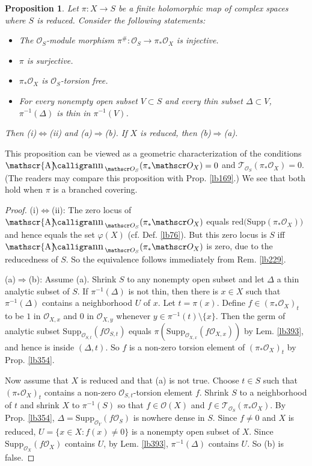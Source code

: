 \documentclass[12pt,b5paper,notitlepage]{report}
\theoremstyle{definition}
\theoremstyle{plain}
\newtheorem{pp}[df]{Proposition}
\DeclareMathOperator{\sann}{\mathscr{A}\text{\kern -3pt {\calligra\large nn}}\,}
\newcommand{\scr}{\mathscr}
\newcommand{\Supp}{\mathrm{Supp}}
\newcommand{\red}{\mathrm{red}}
\numberwithin{equation}{section}
\begin{document}
\begin{pp}\label{lb230}
Let $\pi:X\rightarrow S$ be a finite holomorphic map of complex spaces where $S$ is reduced. Consider the following statements:
\begin{itemize}
\item[(i)] The $\scr O_S$-module morphism $\pi^\#:\scr O_S\rightarrow \pi_*\scr O_X$ is injective.
\item[(ii)] $\pi$ is surjective. 
\item[(a)] $\pi_*\scr O_X$ is $\scr O_S$-torsion free.
\item[(b)] For every nonempty open subset $V\subset S$ and every thin subset $\Delta\subset V$, $\pi^{-1}(\Delta)$ is thin in $\pi^{-1}(V)$.
\end{itemize}
Then (i)$\Leftrightarrow$(ii) and (a)$\Rightarrow$(b). If $X$ is reduced, then (b)$\Rightarrow$(a).
\end{pp}

This proposition can be viewed as a geometric characterization of the conditions $\sann_{\scr O_S}(\pi_*\scr O_X)=0$ and $\scr T_{\scr O_S}(\pi_*\scr O_X)=0$. (The readers may compare this proposition with Prop. \ref{lb169}.) We see that both hold when $\pi$ is a branched covering.

\begin{proof}
(i)$\Leftrightarrow$(ii): The zero locus of $\sann_{\scr O_S}(\pi_*\scr O_X)$ equals $\red\big(\Supp(\pi_*\scr O_X)\big)$ and hence equals the set $\varphi(X)$ (cf. Def. \ref{lb76}). But this zero locus is $S$ iff $\sann_{\scr O_S}(\pi_*\scr O_X)$ is zero, due to the reducedness of $S$. So the equivalence follows immediately from Rem. \ref{lb229}. 



(a)$\Rightarrow$(b): Assume (a). Shrink $S$ to any nonempty open subset and let $\Delta$ a thin analytic subset of $S$. If $\pi^{-1}(\Delta)$ is not thin, then there is $x\in X$ such that $\pi^{-1}(\Delta)$ contains a neighborhood $U$ of $x$. Let $t=\pi(x)$. Define $f\in (\pi_*\scr O_X)_t$ to be $1$ in $\scr O_{X,x}$ and $0$ in $\scr O_{X,y}$ whenever $y\in\pi^{-1}(t)\setminus\{x\}$. Then the germ of analytic subset $\Supp_{\scr O_{S,t}}(f\scr O_{S,t})$ equals $\pi(\Supp_{\scr O_{X,x}}(f\scr O_{X,x}))$ by Lem. \ref{lb393}, and hence is inside $(\Delta,t)$. So $f$ is a non-zero torsion element of $(\pi_*\scr O_X)_t$ by Prop. \ref{lb354}.

Now assume that $X$ is reduced and that (a) is not true. Choose $t\in S$ such that $(\pi_*\scr O_X)_t$ contains a non-zero $\scr O_{S,t}$-torsion element $f$. Shrink $S$ to a neighborhood of $t$ and shrink $X$ to $\pi^{-1}(S)$ so that $f\in\scr O(X)$ and $f\in\scr T_{\scr O_S}(\pi_*\scr O_X)$. By Prop. \ref{lb354}, $\Delta=\Supp_{\scr O_Y}(f\scr O_S)$ is nowhere dense in $S$. Since $f\neq 0$ and $X$ is reduced, $U=\{x\in X:f(x)\neq 0\}$ is a nonempty open subset of $X$. Since $\Supp_{\scr O_X}(f\scr O_X)$ contains $U$, by Lem. \ref{lb393}, $\pi^{-1}(\Delta)$ contains $U$. So (b) is false.
\end{proof}
\end{document}
